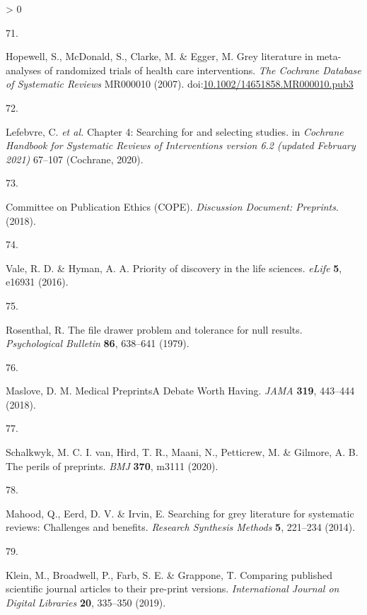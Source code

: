 \documentclass[a4paper, twoside]{templates/ociamthesis}
\newlength{\cslhangindent}
\newlength{\csllabelwidth}
\newenvironment{CSLReferences}[3] %
 {%
  \setlength{\parindent}{0pt}
  \ifodd #1 \everypar{\setlength{\hangindent}{\cslhangindent}}\ignorespaces\fi
  \ifnum #2 > 0
  \setlength{\parskip}{#2\baselineskip}
  \fi
 }%
 {}
\newcommand{\CSLLeftMargin}[1]{\parbox[t]{\maxof{\widthof{#1}}{\csllabelwidth}}{#1}}
\newcommand{\CSLRightInline}[1]{\parbox[t]{\linewidth - \csllabelwidth}{#1}}
\begin{document}
\begin{CSLReferences}{0}{0}
\leavevmode\hypertarget{ref-hopewell2007}{}%
\CSLLeftMargin{71. }
\CSLRightInline{Hopewell, S., McDonald, S., Clarke, M. \& Egger, M. Grey literature in meta-analyses of randomized trials of health care interventions. \emph{The Cochrane Database of Systematic Reviews} MR000010 (2007). doi:\href{https://doi.org/10.1002/14651858.MR000010.pub3}{10.1002/14651858.MR000010.pub3}}

\leavevmode\hypertarget{ref-lefebvre2019searching}{}%
\CSLLeftMargin{72. }
\CSLRightInline{Lefebvre, C. \emph{et al.} Chapter 4: {Searching} for and selecting studies. in \emph{Cochrane {Handbook} for {Systematic Reviews} of {Interventions} version 6.2 (updated {February} 2021)} 67--107 ({Cochrane}, 2020).}

\leavevmode\hypertarget{ref-committeeonpublicationethicscope2018}{}%
\CSLLeftMargin{73. }
\CSLRightInline{Committee on Publication Ethics (COPE). \emph{Discussion {Document}: {Preprints}}. (2018).}

\leavevmode\hypertarget{ref-vale2016}{}%
\CSLLeftMargin{74. }
\CSLRightInline{Vale, R. D. \& Hyman, A. A. Priority of discovery in the life sciences. \emph{eLife} \textbf{5}, e16931 (2016).}

\leavevmode\hypertarget{ref-rosenthal1979}{}%
\CSLLeftMargin{75. }
\CSLRightInline{Rosenthal, R. The file drawer problem and tolerance for null results. \emph{Psychological Bulletin} \textbf{86}, 638--641 (1979).}

\leavevmode\hypertarget{ref-maslove2018}{}%
\CSLLeftMargin{76. }
\CSLRightInline{Maslove, D. M. Medical {Preprints}{{A Debate Worth Having}}. \emph{JAMA} \textbf{319}, 443--444 (2018).}

\leavevmode\hypertarget{ref-schalkwyk2020}{}%
\CSLLeftMargin{77. }
\CSLRightInline{Schalkwyk, M. C. I. van, Hird, T. R., Maani, N., Petticrew, M. \& Gilmore, A. B. The perils of preprints. \emph{BMJ} \textbf{370}, m3111 (2020).}

\leavevmode\hypertarget{ref-mahood2014}{}%
\CSLLeftMargin{78. }
\CSLRightInline{Mahood, Q., Eerd, D. V. \& Irvin, E. Searching for grey literature for systematic reviews: Challenges and benefits. \emph{Research Synthesis Methods} \textbf{5}, 221--234 (2014).}

\leavevmode\hypertarget{ref-klein2019}{}%
\CSLLeftMargin{79. }
\CSLRightInline{Klein, M., Broadwell, P., Farb, S. E. \& Grappone, T. Comparing published scientific journal articles to their pre-print versions. \emph{International Journal on Digital Libraries} \textbf{20}, 335--350 (2019).}


\end{CSLReferences}
\end{document}
